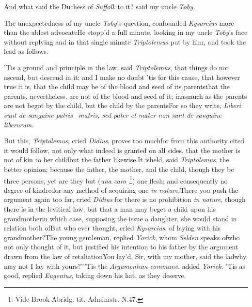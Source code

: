 \documentclass{article}
\begin{document}
And what said the Duchess of \textit{Suffolk} to it? said my uncle
\textit{Toby}.

The unexpectedness of my uncle\break
\textit{Toby}’s question, confounded \textit{Kysarcius}\break
more than the ablest advocate\tsh He\break
stopp’d a full minute, looking in my\break
uncle \textit{Toby}’s face without replying\tsh{} and in
that single minute \textit{Triptolemus} put by him, and took the lead
as follows.

’Tis a ground and principle in the law, said \textit{Triptolemus}, that things do
not ascend, but descend in it; and I make no doubt ’tis for this cause, that however
true it is, that the child may be of the blood and seed of its parents\tsh that the
parents, nevertheless, are not of the blood and seed of it; inasmuch as the parents
are not begot by the child, but the child by the parents\tsk For so they write,
\textit{Liberi sunt de sanguine patris \et\ matris, sed
pater et mater non sunt de
sanguine liberorum.}

\tsh But this, \textit{Triptolemus}, cried \textit{Didius}, proves too much\tsk for from this
authority cited it would follow, not only\break
what indeed is granted on all sides,
that the mother is not of kin to her\break
child\tsk but the father likewise.\tsh It is\break held, said
\textit{Triptolemus}, the better opinion; because the
father, the mother,\break
and the child, though they be three\break
persons, yet are they but (\textit{una caro}\ \footnote{Vide Brook Abridg. tit. Administr. N.47.})\break
one flesh; and consequently no degree\break
of kindred\tsk or any method of acquiring one \textit{in
nature.}\tsk There you push the argument again too far,
cried \textit{Didius}\tsh\break
for there is no prohibition \textit{in nature},\break
though there is in the levitical law,\tsk\break
but that a man may beget a child upon\break
his grandmother\tsh in which case, supposing
the issue a daughter, she would stand in relation both
of\tsh But who\break
ever thought, cried \textit{Kysarcius}, of laying with his
grandmother?\tsk The young\break
gentleman, replied \textit{Yorick}, whom \textit{Selden}\break
speaks of\tsk who not only thought of it,
but justified his intention to his father\break
by the argument drawn from the law\break
of retaliation\tsh \lqq You lay’d, Sir,\break
\lqq with my mother, said the lad\tsk why\break
\lqq may not I lay with yours?”\tsk ’Tis\break
the \textit{Argumentum commune}, added
\textit{Yorick.}\break
\tsk ’Tis as good, replied \textit{Eugenius}, taking down his hat, as they deserve.
\end{document}
